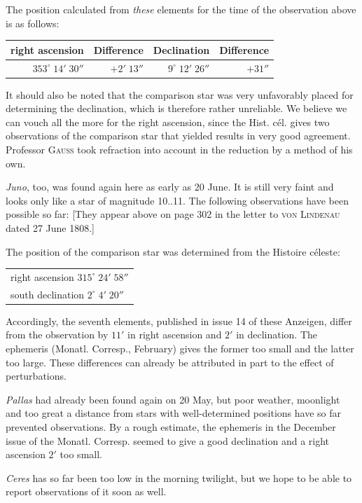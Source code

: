 \par\indent The position calculated from \emph{these} elements for the time of the observation above is as follows:


\begin{center}\fontsize{10}{12}\selectfont\setlength{\tabcolsep}{3pt}\renewcommand{\arraystretch}{1.15}\begin{tabular}{rrrr}
right ascension & Difference & Declination & Difference\\\hline
$353^\circ\;14'\;30''$ & $+2'\;13''$ & $9^\circ\;12'\;26''$ & $+31''$\\
\end{tabular}\end{center}


\par\indent It should also be noted that the comparison star was very unfavorably placed for determining the declination, which is therefore rather unreliable. We believe we can vouch all the more for the right ascension, since the Hist. cél. gives two observations of the comparison star that yielded results in very good agreement. Professor \textsc{Gauss} took refraction into account in the reduction by a method of his own.

\par\indent \emph{Juno}, too, was found again here as early as 20 June. It is still very faint and looks only like a star of magnitude 10..11. The following observations have been possible so far: [They appear above on page 302 in the letter to \textsc{von Lindenau} dated 27 June 1808.]

\par\indent The position of the comparison star was determined from the Histoire céleste:


\begin{center}\fontsize{10}{12}\selectfont\setlength{\tabcolsep}{3pt}\renewcommand{\arraystretch}{1.15}\begin{tabular}{l}
right ascension $315^\circ\;24'\;58''$\\
south declination $2^\circ\;4'\;20''$
\end{tabular}\end{center}


\par\indent Accordingly, the seventh elements, published in issue 14 of these Anzeigen, differ from the observation by $11'$ in right ascension and $2'$ in declination. The ephemeris (Monatl. Corresp., February) gives the former too small and the latter too large. These differences can already be attributed in part to the effect of perturbations.

\par\indent \emph{Pallas} had already been found again on 20 May, but poor weather, moonlight and too great a distance from stars with well-determined positions have so far prevented observations. By a rough estimate, the ephemeris in the December issue of the Monatl. Corresp. seemed to give a good declination and a right ascension $2'$ too small.

\par\indent \emph{Ceres} has so far been too low in the morning twilight, but we hope to be able to report observations of it soon as well.

